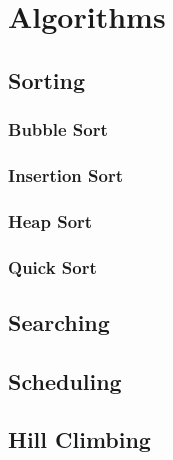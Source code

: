 \chapter{Algorithms}

\section{Sorting}

\subsection{Bubble Sort}

\subsection{Insertion Sort}

\subsection{Heap Sort}

\subsection{Quick Sort}

\section{Searching}

\section{Scheduling}

\section{Hill Climbing}
